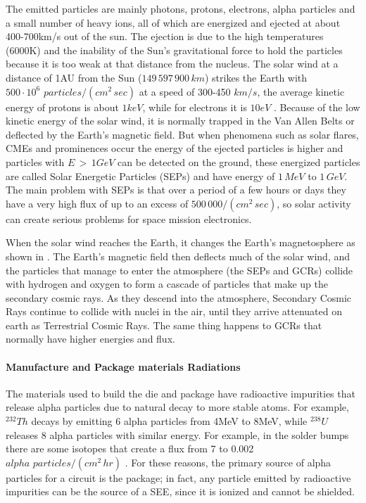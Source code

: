 {{{{{					The emitted particles are mainly photons, protons, electrons, alpha particles and a small number of heavy ions, all of which are energized and ejected at about 400-700km/s out of the sun. The ejection is due to the high temperatures (6000K) and the inability of the Sun's gravitational force to hold the particles because it is too weak at that distance from the nucleus. The solar wind at a distance of 1AU from the Sun  ($149\,597\,900\,km$) strikes the Earth with $500\cdot 10^6\,\, particles/(cm^2\,sec)$ at a speed of 300-450$\,\,km/s$, the average kinetic energy of protons is about $1keV$, while for electrons it is $10eV$ . Because of the low kinetic energy of the solar wind, it is normally trapped in the Van Allen Belts or deflected by the Earth's magnetic field. But when phenomena such as solar flares, CMEs and prominences occur the energy of the ejected particles is higher and particles with $E\,>\,1GeV$ can be detected on the ground, these energized particles are called Solar Energetic Particles (SEPs) and have energy of $1\,MeV$ to $1\,GeV$. The main problem with SEPs is that over a period of a few hours or days they have a very high flux of up to an excess of $500\,000/(cm^2\,sec)$, so solar activity can create serious problems for space mission electronics.
		
					When the solar wind reaches the Earth, it changes the Earth's magnetosphere as shown in . The Earth's magnetic field then deflects much of the solar wind, and the particles that manage to enter the atmosphere (the SEPs and GCRs) collide with hydrogen and oxygen to form a cascade of particles that make up the secondary cosmic rays. As they descend into the atmosphere, Secondary Cosmic Rays continue to collide with nuclei in the air, until they arrive attenuated on earth as Terrestrial Cosmic Rays. The same thing happens to GCRs that normally have higher energies and flux.
				}%
			
				\paragraph{Manufacture and Package materials Radiations}{
					The materials used to build the die and package have radioactive impurities that release alpha particles due to natural decay to more stable atoms. For example, $^{232}Th$ decays by emitting 6 alpha particles from 4MeV to 8MeV, while $^{238}U$ releases 8 alpha particles with similar energy. For example, in the solder bumps there are some isotopes that create a flux from 7 to 0.002 $alpha\,\,particles/(cm^2\,hr)$ . For these reasons, the primary source of alpha particles for a circuit is the package; in fact, any particle emitted by radioactive impurities can be the source of a SEE, since it is ionized and cannot be shielded.
					
}}}}}

